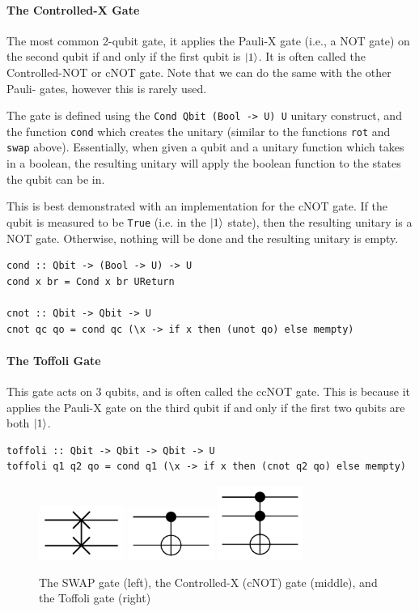 \documentclass[a4paper,11pt, titlepage, twoside]{article}
\begin{document}
\paragraph{The Controlled-X Gate}
The most common 2-qubit gate, it applies the Pauli-X gate (i.e., a NOT gate) on the second qubit if and only if the first qubit is $\ket{1}$. It is often called the Controlled-NOT or cNOT gate. Note that we can do the same with the other Pauli- gates, however this is rarely used.\par
The gate is defined using the \texttt{Cond Qbit (Bool -> U) U} unitary construct, and the function \texttt{cond} which creates the unitary (similar to the functions \texttt{rot} and \texttt{swap} above). Essentially, when given a qubit and a unitary function which takes in a boolean, the resulting unitary will apply the boolean function to the states the qubit can be in.\par
This is best demonstrated with an implementation for the cNOT gate. If the qubit is measured to be \texttt{True} (i.e. in the $\ket{1}$ state), then the resulting unitary is a NOT gate. Otherwise, nothing will be done and the resulting unitary is empty.
\begin{verbatim}
cond :: Qbit -> (Bool -> U) -> U
cond x br = Cond x br UReturn

cnot :: Qbit -> Qbit -> U
cnot qc qo = cond qc (\x -> if x then (unot qo) else mempty)
\end{verbatim}

\paragraph{The Toffoli Gate}
This gate acts on 3 qubits, and is often called the ccNOT gate. This is because it applies the Pauli-X gate on the third qubit if and only if the first two qubits are both $\ket{1}$. 
\begin{verbatim}
toffoli :: Qbit -> Qbit -> Qbit -> U
toffoli q1 q2 qo = cond q1 (\x -> if x then (cnot q2 qo) else mempty)
\end{verbatim}
\begin{figure}[H]
	\centering
	\includegraphics[width=0.25\textwidth]{swap}
	\includegraphics[width=0.25\textwidth]{cnot}
	\includegraphics[width=0.25\textwidth]{toffoli}
	\caption{The SWAP gate (left), the Controlled-X (cNOT) gate (middle), and the Toffoli gate (right)}
\end{figure}
\end{document}
